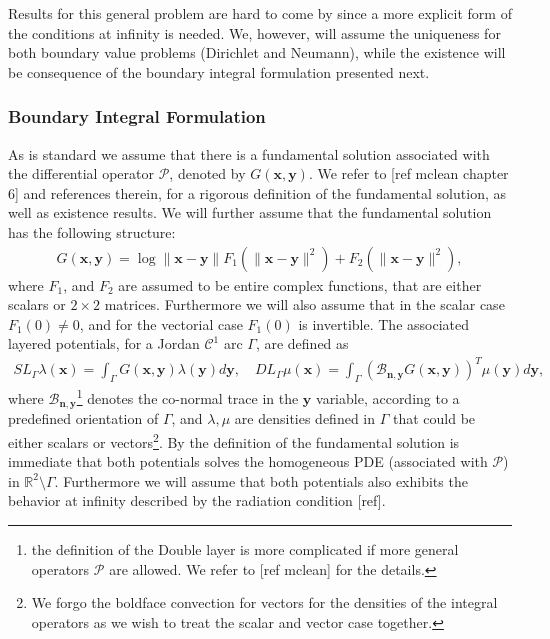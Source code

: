 \documentclass{article}
\newcommand{\vx}{\bm{x}}
\newcommand{\todo}[1]{{\color{red}[#1]}}
\newcommand{\IR}{{\mathbb R}}
\newcommand{\cP}{\mathcal{P}}
\newcommand{\bn}{\bm{n}}
\newcommand{\bx}{\bm{x}}
\newcommand{\by}{\bm{y}}
\begin{document}
Results for this general problem are hard to come by since a more explicit form of the conditions at infinity is needed. We, however, will assume the uniqueness for both boundary value problems (Dirichlet and Neumann), while the existence will be consequence of the boundary integral formulation presented next. 
\subsubsection{Boundary Integral Formulation}
\label{sec:bif}
As is standard we assume that there is a fundamental solution associated with the differential operator $\cP$, denoted by $G(\vx,\by)$. We refer to \todo{ref mclean chapter 6} and references therein, for a rigorous definition of the fundamental solution, as well as existence results. We will further assume that the fundamental solution has the following structure:
\begin{align}
\label{eq:funsolgen}
G(\bx,\by )  =
\log \|\bx -\by \| F_1(\|\bx -\by \| ^2)+F_2(\|\bx -\by \| ^2),
\end{align}
where $F_1$, and $F_2$ are assumed to be entire complex functions, that are either scalars or $2 \times 2$ matrices. Furthermore we will also assume that in the scalar case $F_1(0) \neq 0$, and for the vectorial case $F_1(0)$ is invertible. The associated layered potentials, for a Jordan $\mathcal{C}^1$ arc $\Gamma$, are defined as 
\begin{align*}
SL_\Gamma \lambda(\bx) = \int_\Gamma G(\bx,\by) \lambda(\by) d\by, \quad DL_\Gamma \mu(\bx) = \int_\Gamma \left(\mathcal{B}_{\bn,\by} G(\bx,\by) \right)^T \mu(\by) d\by,
\end{align*} 
where $\mathcal{B}_{\bn,\by}$\footnote{the definition of the Double layer is more complicated if more general operators $\cP$ are allowed. We refer to \todo{ref mclean} for the details.} denotes the co-normal trace in the $\by$ variable, according to a predefined orientation of $\Gamma$, and $\lambda, \mu$ are densities defined in $\Gamma$ that could be either scalars or vectors\footnote{We forgo the boldface convection for vectors for the densities of the integral operators as we wish to treat the scalar and vector case together.}. By the definition of the fundamental solution is immediate that both potentials solves the homogeneous PDE (associated with $\cP$) in $\IR^2 \setminus \Gamma$. Furthermore we will assume that both potentials also exhibits the behavior at infinity described by the radiation condition \todo{ref}. 
\end{document}
